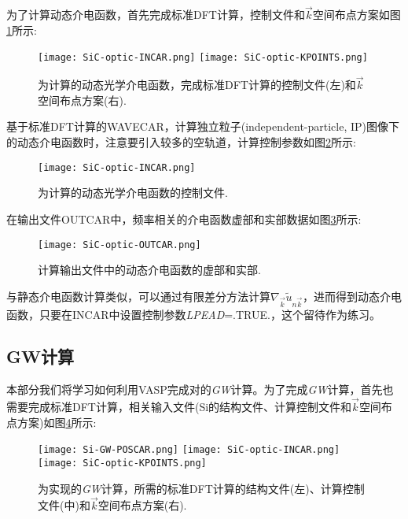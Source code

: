 为了计算动态介电函数，首先完成标准\textrm{DFT}计算，控制文件和$\vec k$空间布点方案如图\ref{SiC-optic-Input}所示:~
\begin{figure}[h!]
\centering
\texttt{[image: SiC-optic-INCAR.png]}
\texttt{[image: SiC-optic-KPOINTS.png]}
\caption{\small \textrm{为计算的动态光学介电函数，完成标准\textrm{DFT}计算的控制文件(左)和$\vec k$空间布点方案(右).}}%
\label{SiC-optic-Input}
\end{figure}

基于标准\textrm{DFT}计算的\textrm{WAVECAR}，计算独立粒子\textrm{(independent-particle, IP)}图像下的动态介电函数时，注意要引入较多的空轨道，计算控制参数如图\ref{SiC-optic-INCAR}所示:
\begin{figure}[h!]
\centering
\texttt{[image: SiC-optic-INCAR.png]}
\caption{\small \textrm{为计算的动态光学介电函数的控制文件.}}%
\label{SiC-optic-INCAR}
\end{figure}

在输出文件\textrm{OUTCAR}中，频率相关的介电函数虚部和实部数据如图\ref{SiC-optic-OUTCAR}所示:~
\begin{figure}[h!]
\centering
\texttt{[image: SiC-optic-OUTCAR.png]}
\caption{\small \textrm{计算输出文件中的动态介电函数的虚部和实部.}}%
\label{SiC-optic-OUTCAR}
\end{figure}
与静态介电函数计算类似，可以通过有限差分方法计算$\nabla_{\vec k}\tilde u_{n\vec k}$，进而得到动态介电函数，只要在\textrm{INCAR}中设置控制参数\textrm{\textit{LPEAD}=.TRUE.}，这个留待作为练习。

\subsection{GW计算}
本部分我们将学习如何利用\textrm{VASP}完成对的\textit{GW}计算。为了完成\textit{GW}计算，首先也需要完成标准\textrm{DFT}计算，相关输入文件(\textrm{Si}的结构文件、计算控制文件和$\vec k$空间布点方案)如图\ref{Si-GW-Input}所示:~
\begin{figure}[h!]
\centering
\texttt{[image: Si-GW-POSCAR.png]}
\texttt{[image: SiC-optic-INCAR.png]}
\texttt{[image: SiC-optic-KPOINTS.png]}
\caption{\small \textrm{为实现的\textit{GW}计算，所需的标准\textrm{DFT}计算的结构文件(左)、计算控制文件(中)和$\vec k$空间布点方案(右).}}%
\label{Si-GW-Input}
\end{figure}

